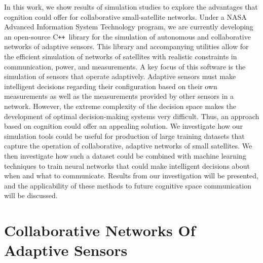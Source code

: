 \documentclass[conference]{IEEEtran}
\newcommand{\cpp}{C\texttt{++}~}
\begin{document}
In this work, we show results of simulation studies to explore the advantages
that cognition could offer for collaborative small-satellite networks.  Under a
NASA Advanced Information System Technology program, we are currently developing
an open-source \cpp library for the simulation of autonomous and collaborative
networks of adaptive sensors.  This library and accompanying utilities allow for
the efficient simulation of networks of satellites with realistic constraints in
communication, power, and measurements.  A key focus of this software is the
simulation of sensors that operate adaptively.  Adaptive sensors must make
intelligent decisions regarding their configuration based on their own
measurements as well as the measurements provided by other sensors in a network.
However, the extreme complexity of the decision space makes the development of
optimal decision-making systems very difficult.  Thus, an approach based on
cognition could offer an appealing solution.  We investigate how our simulation
tools could be useful for production of large training datasets that capture the
operation of collaborative, adaptive networks of small satellites.  We then
investigate how such a dataset could be combined with machine learning
techniques to train neural networks that could make intelligent decisions about
when and what to communicate.  Results from our investigation will be presented,
and the applicability of these methods to future cognitive space communication
will be discussed.


\section{Collaborative Networks Of Adaptive Sensors}
\label{sec:overview}

%
%
%
%
%
\end{document}
